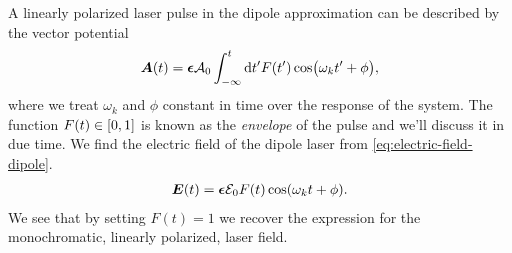         A linearly polarized laser pulse in the dipole approximation can be
        described by the vector potential \cite{joachain2012atoms}
        \begin{align}
            \boldsymbol{A}(t)
            = \boldsymbol{\epsilon} \mathcal{A}_0
            \int_{-\infty}^{t}
            \dd t'
            F(t')
            \cos(\omega_k t' + \phi),
        \end{align}
        where we treat $\omega_k$ and $\phi$ constant in time over the response
        of the system.
        The function $F(t) \in \left[ 0, 1 \right]$ is known as the \emph{envelope} of the
        pulse and we'll discuss it in due time.
        We find the electric field of the dipole laser from
        \autoref{eq:electric-field-dipole}.
        \begin{align}
            \boldsymbol{E}(t)
            = \boldsymbol{\epsilon} \mathcal{E}_0 F(t) \cos(\omega_k t + \phi).
        \end{align}
        We see that by setting $F(t) = 1$ we recover the expression for the
        monochromatic, linearly polarized, laser field.

